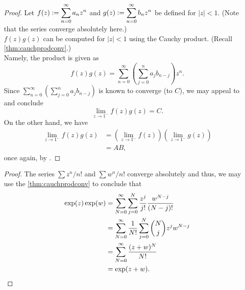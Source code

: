 \cauchabel*\label{cor:cauchabel2}
\begin{flushright}\hyperref[cor:cauchabel]{\upsym}\end{flushright}
\begin{proof}
	Let $f(z) \vcentcolon= \displaystyle\sum_{n=0}^{\infty}a_nz^n$ and $g(z) \vcentcolon= \displaystyle\sum_{n=0}^{\infty}b_nz^n$ be defined for $|z| < 1.$ (Note that the series converge absolutely here.)\\
	$f(z)g(z)$ can be computed for $|z| < 1$ using the Cauchy product. (Recall \cref{thm:cauchprodconv}.)\\
	Namely, the product is given as
	\begin{equation*} 
		f(z)g(z) = \sum_{n=0}^{\infty}\left(\sum_{j=0}^{n}a_jb_{n-j}\right)z^n.
	\end{equation*}
	Since $\displaystyle\sum_{n=0}^{\infty}\left(\sum_{j=0}^{n}a_jb_{n-j}\right)$ is known to converge (to $C$), we may appeal to  and conclude
	\begin{equation*} 
		\lim_{z\to 1^-}f(z)g(z) = C.
	\end{equation*}
	On the other hand, we have
	\begin{align*} 
		\lim_{z\to 1^-}f(z)g(z) &= \left(\lim_{z\to 1^-}f(z)\right)\left(\lim_{z\to 1^-}g(z)\right)\\
		&= AB,
	\end{align*}
	once again, by .
\end{proof}

\expadd*\label{thm:expadd2}
\begin{flushright}\hyperref[thm:expadd]{\upsym}\end{flushright}
\begin{proof}
	The series $\sum z^n/n!$ and $\sum w^n/n!$ converge absolutely and thus, we may use the \cref{thm:cauchprodconv} to conclude that
	\begin{align*} 
		\exp(z)\exp(w) &= \sum_{N=0}^{\infty}\sum_{j=0}^{N}\dfrac{z^j}{j!}\dfrac{w^{N-j}}{(N - j)!}\\
		&= \sum_{N=0}^{\infty}\dfrac{1}{N!}\sum_{j=0}^{N}\dbinom{N}{j}z^jw^{N-j}\\
		&=\sum_{N=0}^{\infty}\dfrac{(z + w)^N}{N!}\\
		&= \exp(z + w).
	\end{align*}	
\end{proof}

